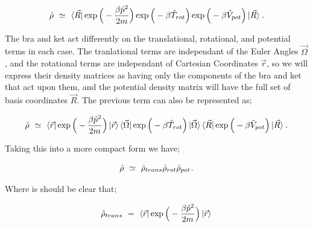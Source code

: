 \documentclass{article}
\begin{document}
\begin{equation} \label{eb-eq-1-227}
\hat{\rho} \hspace{0.125cm} \simeq \hspace{0.125cm} \bra{\vec{R}} \exp \Big( - \frac{\beta \hat{p}^2}{2 m} \Big) \exp \Big( - \beta \hat{T}_{rot} \Big) \exp \Big( - \beta \hat{V}_{pot} \Big)  \ket{\vec{R}} \hspace{0.025cm} . \end{equation}

The bra and ket act differently on the translational, rotational, and potential terms in each case. The tranlational terms are independant of the Euler Angles \begin{math} \vec{\Omega} \end{math}, and the rotational terms are independant of Cartesian Coordinates \begin{math} \vec{r} \end{math}, so we will express their density matrices as having only the components of the bra and ket that act upon them, and the potential density matrix will have the full set of basis coordinates \begin{math} \vec{R} \end{math}. The previous term can also be represented as;

\begin{equation} \label{eb-eq-1-228}
\hat{\rho} \hspace{0.125cm} \simeq \hspace{0.125cm} \bra{\vec{r}} \exp \Big( - \frac{\beta \hat{p}^2}{2 m} \Big) \ket{\vec{r}} \bra{\vec{\Omega}} \exp \Big( - \beta \hat{T}_{rot} \Big) \ket{\vec{\Omega}} \bra{\vec{R}} \exp \Big( - \beta \hat{V}_{pot} \Big) \ket{\vec{R}} \hspace{0.025cm} . \end{equation}

Taking this into a more compact form we have;

\begin{equation} \label{eb-eq-1-229}
\hat{\rho} \hspace{0.125cm} \simeq \hspace{0.125cm} \hat{\rho}_{trans} \hat{\rho}_{rot} \hat{\rho}_{pot} \hspace{0.025cm} .
\end{equation}

Where is should be clear that;

\begin{equation} \label{eb-eq-1-230}
\hat{\rho}_{trans} \hspace{0.125cm} = \hspace{0.125cm} \bra{\vec{r}} \exp \Big( - \frac{\beta \hat{p}^2}{2 m} \Big) \ket{\vec{r}} \hspace{0.025cm} 
\end{equation}
\end{document}
